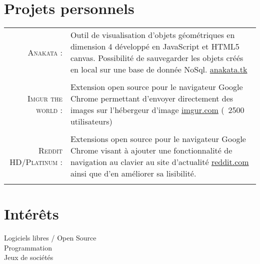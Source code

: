 \documentclass[a4paper,10pt]{article}
\begin{document}
\section{Projets personnels}
\begin{tabular}{r|p{11cm}}
  \textsc{Anakata :}             & Outil de visualisation d'objets géométriques en dimension 4 développé en JavaScript et HTML5 canvas. Possibilité de sauvegarder les objets créés en local sur une base de donnée NoSql. \href{http://anakata.tk}{anakata.tk} \\
  \multicolumn{2}{c}{} \\
  \textsc{Imgur the world :}     & Extension open source pour le navigateur Google Chrome permettant d'envoyer directement des images sur l'hébergeur d'image \href{http://imgur.com}{imgur.com} (~2500 utilisateurs)                                            \\
  \multicolumn{2}{c}{} \\     
  \textsc{Reddit HD/Platinum :}  & Extensions open source pour le navigateur Google Chrome visant à ajouter une fonctionnalité de navigation au clavier au site d'actualité \href{http://www.reddit.com}{reddit.com} ainsi que d'en améliorer sa lisibilité.     \\
  \multicolumn{2}{c}{} \\   
\end{tabular}

\section{Intérêts}
Logiciels libres / Open Source \\
Programmation \\
Jeux de sociétés
\end{document}

